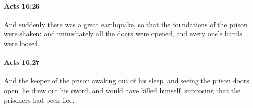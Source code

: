 		\paragraph{Acts 16:26} %
			\label{ACTS-16-26}

			And suddenly there was a great earthquake, so that the foundations of the prison were shaken: and immediately all the doors were opened, and every one's bands were loosed.

			\begin{framed}
			\scriptsize
				\begin{compactdesc}
					\item[SBLG] 
				\end{compactdesc}
			\end{framed}

		\paragraph{Acts 16:27} %
			\label{ACTS-16-27}

			And the keeper of the prison awaking out of his sleep, and seeing the prison doors open, he drew out his sword, and would have killed himself, supposing that the prisoners had been fled.

